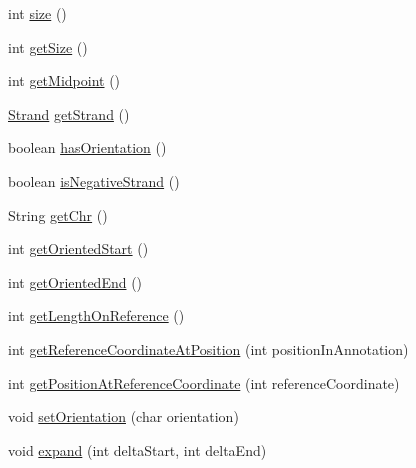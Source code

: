 \begin{DoxyCompactItemize}
\item 
int \hyperlink{classumms_1_1core_1_1annotation_1_1_abstract_annotation_acfe7f4b4188dabba73d9d53de81f240f}{size} ()
\item 
int \hyperlink{classumms_1_1core_1_1annotation_1_1_abstract_annotation_a502d642ef35b9ef95d88156fe0c0114d}{get\+Size} ()
\item 
int \hyperlink{classumms_1_1core_1_1annotation_1_1_abstract_annotation_a52c42de2db42cf6b85583c4d83db8b0e}{get\+Midpoint} ()
\item 
\hyperlink{enumumms_1_1core_1_1annotation_1_1_annotation_1_1_strand}{Strand} \hyperlink{classumms_1_1core_1_1annotation_1_1_abstract_annotation_a3a129fd352007aff4aa44b2a785f6477}{get\+Strand} ()
\item 
boolean \hyperlink{classumms_1_1core_1_1annotation_1_1_abstract_annotation_ac7896752c32f77675d20df424576105b}{has\+Orientation} ()
\item 
boolean \hyperlink{classumms_1_1core_1_1annotation_1_1_abstract_annotation_a4e1da04a01deed1a4b6036a36e24b86e}{is\+Negative\+Strand} ()
\item 
String \hyperlink{classumms_1_1core_1_1annotation_1_1_abstract_annotation_abe1735bf83ddb3aae45c734149c50eb1}{get\+Chr} ()
\item 
int \hyperlink{classumms_1_1core_1_1annotation_1_1_abstract_annotation_a5c5ecd3b98fa57d233844b24ed04637d}{get\+Oriented\+Start} ()
\item 
int \hyperlink{classumms_1_1core_1_1annotation_1_1_abstract_annotation_a46f8f6a0ce8eae87fddbd2fa344ea050}{get\+Oriented\+End} ()
\item 
int \hyperlink{classumms_1_1core_1_1annotation_1_1_abstract_annotation_ae96fae62fc5573abad1e33cbcad29003}{get\+Length\+On\+Reference} ()
\item 
int \hyperlink{classumms_1_1core_1_1annotation_1_1_abstract_annotation_afe9d6ee4987afb23a573988a3bb922fd}{get\+Reference\+Coordinate\+At\+Position} (int position\+In\+Annotation)
\item 
int \hyperlink{classumms_1_1core_1_1annotation_1_1_abstract_annotation_a68f1acbc77b4fcf0eb0220a5ccd79281}{get\+Position\+At\+Reference\+Coordinate} (int reference\+Coordinate)
\item 
void \hyperlink{classumms_1_1core_1_1annotation_1_1_abstract_annotation_a2d6aae9b87d1544ef70124ab587d436d}{set\+Orientation} (char orientation)
\item 
void \hyperlink{classumms_1_1core_1_1annotation_1_1_abstract_annotation_acd6bf20781f96c5739491d77f4d3bb97}{expand} (int delta\+Start, int delta\+End)

\end{DoxyCompactItemize}
